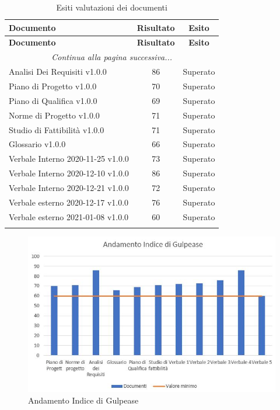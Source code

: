 \documentclass[../piano_di_qualifica.tex]{subfiles}
\begin{document}
\begin{center}
	\begin{longtable}{|l|c|c|}
		\hline
		\rowcolor{lightgray}
		\textbf{Documento}                 & \textbf{Risultato} & \textbf{Esito} \\
		\hline
		\endfirsthead
	
		\hline
		\rowcolor{lightgray}
		\textbf{Documento}                 & \textbf{Risultato} & \textbf{Esito} \\
		\hline
		\endhead
		
		\hline
		\multicolumn{3}{|c|}{\emph{Continua alla pagina successiva...}}\\
		\hline
		\endfoot

		\endlastfoot

		Analisi Dei Requisiti v1.0.0       & 86                 & Superato       \\
		Piano di Progetto v1.0.0           & 70                 & Superato       \\
		Piano di Qualifica v1.0.0          & 69                 & Superato       \\
		Norme di Progetto v1.0.0           & 71                 & Superato       \\
		Studio di Fattibilità v1.0.0       & 71                 & Superato       \\
		Glossario v1.0.0                   & 66                 & Superato       \\
		Verbale Interno 2020-11-25 v1.0.0  & 73                 & Superato       \\
		Verbale Interno 2020-12-10 v1.0.0  & 86                 & Superato       \\
		Verbale Interno 2020-12-21 v1.0.0  & 72                 & Superato       \\
		Verbale esterno 2020-12-17  v1.0.0 & 76                 & Superato       \\
		Verbale esterno 2021-01-08  v1.0.0 & 60                 & Superato       \\
		\hline
		\caption{Esiti valutazioni dei documenti}
	\end{longtable}
\end{center}

\begin{figure}[H]
	\centering
	\includegraphics[width=12cm]{componenti/media_gul}
	\caption{ Andamento Indice di Gulpease}
\end{figure}
\end{document}
